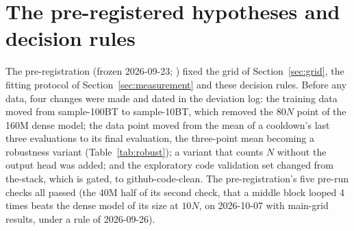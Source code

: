 \section{The pre-registered hypotheses and decision rules}
\label{app:prereg}

The pre-registration (frozen 2026-09-23; \preregcheck) fixed the grid of Section~\ref{sec:grid}, the fitting protocol of
Section~\ref{sec:measurement} and these decision rules. Before any data, four changes were made and dated in the
deviation log: the training data moved from sample-100BT to sample-10BT, which removed the $80N$ point of the 160M dense
model; the data point moved from the mean of a cooldown's last three evaluations to its final evaluation, the
three-point mean becoming a robustness variant (Table~\ref{tab:robust}); a variant that counts $N$ without the output
head was added; and the exploratory code validation set changed from the-stack, which is gated, to github-code-clean.
The pre-registration's five pre-run checks all passed (the 40M half of its second check, that a middle block looped 4
times beats the dense model of its size at $10N$, on 2026-10-07 with main-grid results, under a rule of 2026-09-26).

